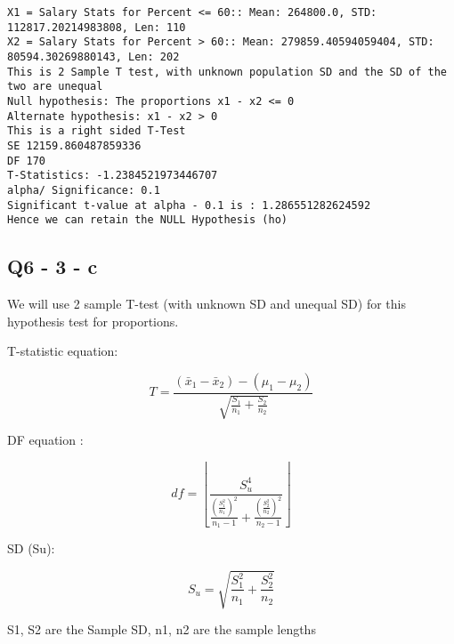 \documentclass[11pt]{article}
\begin{document}
    \begin{Verbatim}[commandchars=\\\{\}]
X1 = Salary Stats for Percent <= 60:: Mean: 264800.0, STD: 112817.20214983808, Len: 110
X2 = Salary Stats for Percent > 60:: Mean: 279859.40594059404, STD: 80594.30269880143, Len: 202
This is 2 Sample T test, with unknown population SD and the SD of the two are unequal
Null hypothesis: The proportions x1 - x2 <= 0
Alternate hypothesis: x1 - x2 > 0
This is a right sided T-Test
SE 12159.860487859336
DF 170
T-Statistics: -1.2384521973446707
alpha/ Significance: 0.1
Significant t-value at alpha - 0.1 is : 1.286551282624592
Hence we can retain the NULL Hypothesis (ho)

    \end{Verbatim}

    \subsection{Q6 - 3 - c}\label{q6---3---c}

We will use 2 sample T-test (with unknown SD and unequal SD) for this
hypothesis test for proportions.

T-statistic equation:

\begin{equation*} T = \frac{(\bar x_1 - \bar x_2) - (\mu _1 - \mu _2)} {\sqrt {\frac {S_1}{n_1} + \frac {S_2} {n_2}}} \end{equation*}

DF equation :

\begin{equation*} df = \left \lfloor{\frac{S_u ^ 4} {\frac{( \frac{S_1 ^ 2}{n_1} )^2}{n_1 - 1} + {\frac{( \frac{S_2 ^ 2}{n_2} )^2}{n_2 - 1}}}} \right \rfloor\end{equation*}

SD (Su):

\begin{equation*} S_u = \sqrt{\frac{S_1 ^ 2}{n_1} + \frac{S_2 ^ 2}{n_2}}  \end{equation*}

S1, S2 are the Sample SD, n1, n2 are the sample lengths
\end{document}
